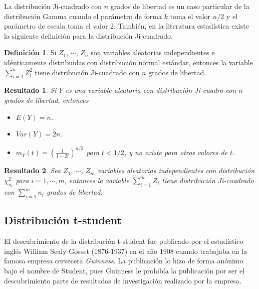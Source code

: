 \documentclass[
  10pt,
  spanish,
]{book}
\providecommand{\tightlist}{%
  \setlength{\itemsep}{0pt}\setlength{\parskip}{0pt}}
\newtheorem{proposition}{Resultado}[chapter]
\theoremstyle{definition}
\newtheorem{definition}{Definición}[chapter]
\theoremstyle{definition}
\theoremstyle{definition}
\theoremstyle{definition}
\theoremstyle{remark}
\begin{document}
La distribución Ji-cuadrado con \(n\) grados de libertad es un caso particular de la distribución Gamma cuando el parámetro de forma \(k\) toma el valor \(n/2\) y el parámetro de escala toma el valor 2. También, en la literatura estadística existe la siguiente definición para la distribución Ji-cuadrado.

\begin{definition}
\protect\hypertarget{def:unnamed-chunk-40}{}{\label{def:unnamed-chunk-40} }Si \(Z_1\), \(\cdots\), \(Z_n\) son variables aleatorias independientes e idénticamente distribuidas con distribución normal estándar, entonces la variable \(\sum_{i=1}^nZ_i^2\) tiene distribución Ji-cuadrado con \(n\) grados de libertad.
\end{definition}

\begin{proposition}
\protect\hypertarget{prp:unnamed-chunk-41}{}{\label{prp:unnamed-chunk-41} }Si \(Y\) es una variable aleatoria con distribución Ji-cuadro con \(n\) grados de libertad, entonces

\begin{itemize}
\tightlist
\item
  \(E(Y)=n\).
\item
  \(Var(Y)=2n\).
\item
  \(m_Y(t)=\left(\frac{1}{1-2t}\right)^{n/2}\) para \(t<1/2\), y no existe para otros valores de \(t\).
\end{itemize}
\end{proposition}

\begin{proposition}
\protect\hypertarget{prp:unnamed-chunk-42}{}{\label{prp:unnamed-chunk-42} }Sea \(Z_1\), \(\cdots\), \(Z_m\) variables aleatorias independientes con distribución \(\chi^2_{n_i}\) para \(i=1,\cdots,m\), entonces la variable \(\sum_{i=1}^mZ_i\) tiene distribución Ji-cuadrado con \(\sum_{i=1}^mn_i\) grados de libertad.
\end{proposition}

\hypertarget{distribuciuxf3n-t-student}{%
\subsection{Distribución t-student}\label{distribuciuxf3n-t-student}}

El descubrimiento de la distribución t-student fue publicado por el estadístico inglés William Sealy Gosset (1876-1937) en el año 1908 cuando trabajaba en la famosa empresa cervecera \emph{Guinness}. La publicación lo hizo de forma anónimo bajo el nombre de Student, pues Guinness le prohibía la publicación por ser el descubrimiento parte de resultados de investigación realizado por la empresa.
\end{document}
